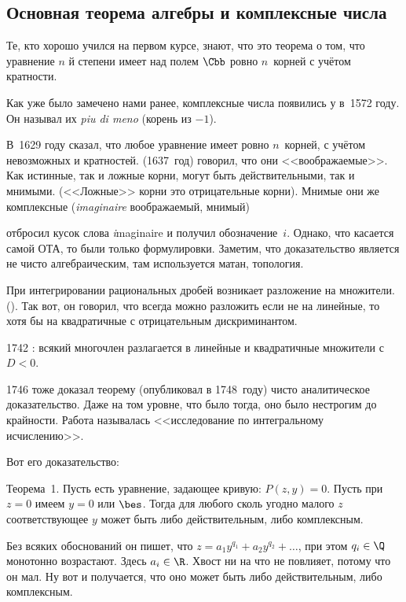 \documentclass[a4paper,oneside,fleqn,10pt]{article}
\begin{document}
\subsection{Основная теорема алгебры и комплексные числа}

Те, кто хорошо учился на первом курсе, знают, что это теорема о том,
что уравнение $n$ й степени имеет над полем $\Cbb$ ровно $n$~корней
с учётом кратности.

Как уже было замечено нами ранее, комплексные числа появились у  в~1572 году.
Он называл их \emph{piu di meno} (корень из $-1$).

В~1629 году  сказал, что любое уравнение имеет ровно
$n$~корней, с учётом невозможных и кратностей.  (1637~год) говорил, что они <<воображаемые>>.
Как истинные, так и ложные корни, могут быть действительными, так и мнимыми.
(<<Ложные>> корни это отрицательные корни). Мнимые они же комплексные
(\emph{imaginaire} воображаемый, мнимый)

 отбросил кусок слова \emph{i}maginaire и получил обозначение~$i$.
Однако, что касается самой ОТА, то были только формулировки. Заметим, что доказательство
является не чисто алгебраическим, там используется матан, топология.

При интегрировании рациональных дробей возникает разложение на множители.
(). Так вот, он говорил, что всегда можно разложить если не на линейные,
то хотя бы на квадратичные с отрицательным дискриминантом.

1742 : всякий многочлен разлагается в линейные и квадратичные множители с $D < 0$.

1746  тоже доказал теорему (опубликовал в 1748~году) чисто аналитическое
доказательство. Даже на том уровне, что было тогда, оно было нестрогим до крайности.
Работа называлась <<исследование по интегральному исчислению>>.

Вот его доказательство:

Теорема~1. Пусть есть уравнение, задающее кривую: $P(z,y) = 0$.
Пусть при $z = 0$ имеем $y = 0$ или $\bes$.
Тогда для любого сколь угодно малого $z$  соответствующее $y$ может быть
либо действительным, либо комплексным.

Без всяких обоснований он пишет, что  $z = a_1 y^{q_1} + a_2 y^{q_2}+ \ldots$,
при этом $q_i \in \Q$ монотонно возрастают. Здесь $a_i \in \R$.
Хвост ни на что не повлияет, потому что он мал. Ну вот и получается, что оно
может быть либо действительным, либо комплексным.
\end{document}
